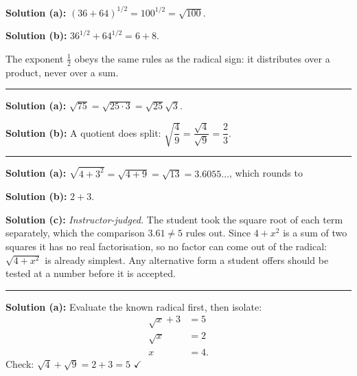 \documentclass[12pt]{article}
\begin{document}

\textbf{Solution (a):} $(36+64)^{1/2} = 100^{1/2} = \sqrt{100}$. 

\textbf{Solution (b):} $36^{1/2} + 64^{1/2} = 6 + 8$. 

The exponent $\tfrac{1}{2}$ obeys the same rules as the radical sign: it
distributes over a product, never over a sum.

\vspace{0.2cm}\noindent\rule{\linewidth}{0.2pt}\vspace{0.2cm}


\textbf{Solution (a):} $\sqrt{75} = \sqrt{25 \cdot 3} = \sqrt{25}\sqrt{3}$.

\textbf{Solution (b):} A quotient does split:
$\sqrt{\dfrac{4}{9}} = \dfrac{\sqrt{4}}{\sqrt{9}} = \dfrac{2}{3}$.

\vspace{0.2cm}\noindent\rule{\linewidth}{0.2pt}\vspace{0.2cm}


\textbf{Solution (a):} $\sqrt{4+3^2} = \sqrt{4+9} = \sqrt{13} = 3.6055\ldots$,
which rounds to 

\textbf{Solution (b):} $2 + 3$. 

\textbf{Solution (c):} \emph{Instructor-judged.} The student took the square root
of each term separately, which the comparison $3.61 \ne 5$ rules out. Since
$4 + x^2$ is a sum of two squares it has no real factorisation, so no factor can
come out of the radical: $\sqrt{4+x^2}$ is already simplest. Any alternative
form a student offers should be tested at a number before it is accepted.

\vspace{0.2cm}\noindent\rule{\linewidth}{0.2pt}\vspace{0.2cm}


\textbf{Solution (a):} Evaluate the known radical first, then isolate:
\begin{align*}
  \sqrt{x} + 3 &= 5 \\
  \sqrt{x} &= 2 \\
  x &= 4 .
\end{align*}
Check: $\sqrt{4} + \sqrt{9} = 2 + 3 = 5$ $\checkmark$ 
\end{document}
